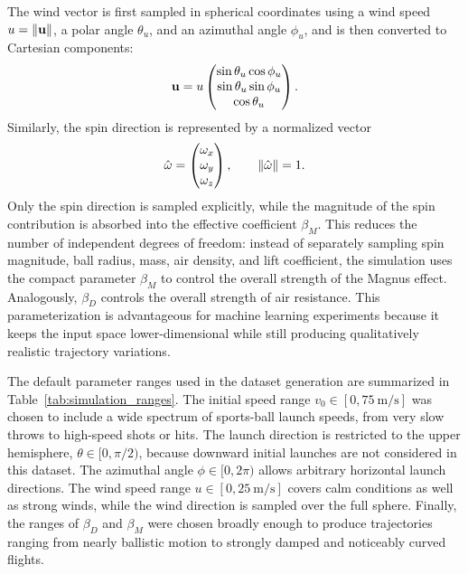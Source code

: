 The wind vector is first sampled in spherical coordinates using a wind speed $u=\norm{\vb{u}}$, a polar angle $\theta_u$, and an azimuthal angle $\phi_u$, and is then converted to Cartesian components:
\begin{equation*}
    \vb{u} = u \begin{pmatrix}
        \sin\theta_u \cos\phi_u \\
        \sin\theta_u \sin\phi_u \\
        \cos\theta_u
    \end{pmatrix}.
\end{equation*}
Similarly, the spin direction is represented by a normalized vector
\begin{equation*}
    \hat{\vb{\omega}} = \begin{pmatrix}
        \omega_x \\ \omega_y \\ \omega_z
    \end{pmatrix}, \qquad \norm{\hat{\vb{\omega}}}=1.
\end{equation*}
Only the spin direction is sampled explicitly, while the magnitude of the spin contribution is absorbed into the effective coefficient $\beta_M$.
This reduces the number of independent degrees of freedom: instead of separately sampling spin magnitude, ball radius, mass, air density, and lift coefficient, the simulation uses the compact parameter $\beta_M$ to control the overall strength of the Magnus effect.
Analogously, $\beta_D$ controls the overall strength of air resistance.
This parameterization is advantageous for machine learning experiments because it keeps the input space lower-dimensional while still producing qualitatively realistic trajectory variations.

The default parameter ranges used in the dataset generation are summarized in Table~\ref{tab:simulation_ranges}.
The initial speed range $v_0 \in [0,\SI{75}{\meter\per\second}]$ was chosen to include a wide spectrum of sports-ball launch speeds, from very slow throws to high-speed shots or hits.
The launch direction is restricted to the upper hemisphere, $\theta \in [0,\pi/2)$, because downward initial launches are not considered in this dataset.
The azimuthal angle $\phi\in[0,2\pi)$ allows arbitrary horizontal launch directions.
The wind speed range $u\in[0,\SI{25}{\meter\per\second}]$ covers calm conditions as well as strong winds, while the wind direction is sampled over the full sphere.
Finally, the ranges of $\beta_D$ and $\beta_M$ were chosen broadly enough to produce trajectories ranging from nearly ballistic motion to strongly damped and noticeably curved flights.

